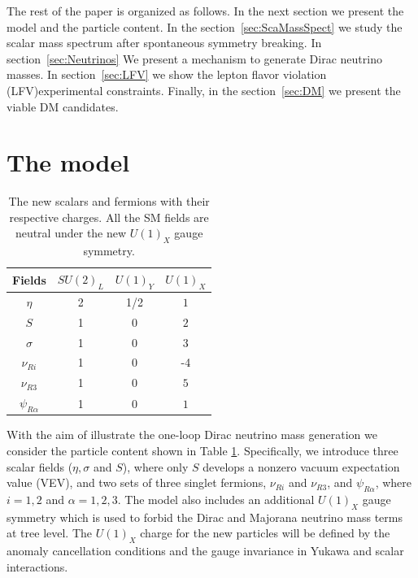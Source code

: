 \documentclass[12pt]{article}
\begin{document}
The rest of the paper is organized as follows. In the next section we present the model and the particle content. In the section~\ref{sec:ScaMassSpect} we study the scalar mass spectrum after spontaneous symmetry breaking. In section~\ref{sec:Neutrinos} We present a mechanism to generate Dirac neutrino masses. In section~\ref{sec:LFV} we show the lepton flavor violation (LFV)experimental  constraints. Finally, in the section~\ref{sec:DM} we present the viable DM candidates.

\section{The model}
\label{sec:Model}
%
\begin{table}[t!]
  \centering
  \begin{tabular}{|c|c|c|c|}
    \hline  
    Fields     & $SU(2)_L$ & $U(1)_Y $ & $U(1)_X$ \\ \hline
    $\eta$  & 2 & 1/2  & $1$ \\
    $S$ & 1 & 0  & $2$ \\
    $\sigma$ & 1 & 0 & $3$ \\
    \hline
    $\nu_{Ri}$ & 1 & 0 & -4\\
    $\nu_{R3}$ & 1 & 0 & $5$\\
    $\psi_{R\alpha}$  & 1 & 0 & $1$ \\\hline
  \end{tabular}
  \caption{The new scalars and fermions with their respective charges. All the SM fields are neutral under the new $U(1)_X$ gauge symmetry. }
    \label{tab:partcont}
\end{table}
%
With the aim of illustrate the one-loop Dirac neutrino mass generation we consider the particle content shown in Table \ref{tab:partcont}. Specifically, we introduce three scalar fields ($\eta, \sigma$ and $S$), where only $S$ develops a nonzero vacuum expectation value (VEV), and two sets of three singlet fermions, $\nu_{Ri}$ and $\nu_{R3}$, and $\psi_{R\alpha}$, where $i=1,2$ and $\alpha=1,2,3$.   
The model also includes an additional $U(1)_X$ gauge symmetry which is used to forbid the Dirac and Majorana neutrino mass terms at tree level.
The $U(1)_X$ charge for the new particles will be defined by the anomaly cancellation conditions and the gauge invariance in Yukawa and scalar interactions.
\end{document}
